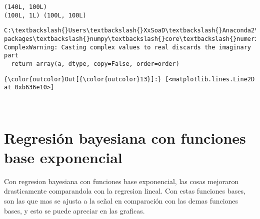 \documentclass[11pt]{article}
\begin{document}
    \begin{Verbatim}[commandchars=\\\{\}]
(140L, 100L)
(100L, 1L) (100L, 100L)

    \end{Verbatim}

    \begin{Verbatim}[commandchars=\\\{\}]
C:\textbackslash{}Users\textbackslash{}XxSoaD\textbackslash{}Anaconda2\textbackslash{}lib\textbackslash{}site-packages\textbackslash{}numpy\textbackslash{}core\textbackslash{}numeric.py:492: ComplexWarning: Casting complex values to real discards the imaginary part
  return array(a, dtype, copy=False, order=order)

    \end{Verbatim}

\begin{Verbatim}[commandchars=\\\{\}]
{\color{outcolor}Out[{\color{outcolor}13}]:} [<matplotlib.lines.Line2D at 0xb636e10>]
\end{Verbatim}
            
    \begin{center}
    \end{center}
    { \hspace*{\fill} \\}
    
    \section{Regresión bayesiana con funciones base
exponencial}\label{regresiuxf3n-bayesiana-con-funciones-base-exponencial}

Con regresion bayesiana con funciones base exponencial, las cosas
mejoraron drasticamente comparandola con la regresion lineal. Con estas
funciones bases, son las que mas se ajusta a la señal en comparación con
las demas funciones bases, y esto se puede apreciar en las graficas.
\end{document}
